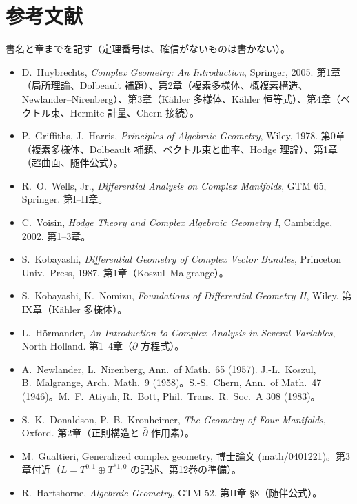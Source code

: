\section*{参考文献}
書名と章までを記す（定理番号は、確信がないものは書かない）。
\begin{itemize}
\item D.~Huybrechts, \emph{Complex Geometry: An Introduction}, Springer, 2005. 第1章（局所理論、Dolbeault 補題）、第2章（複素多様体、概複素構造、Newlander--Nirenberg）、第3章（Kähler 多様体、Kähler 恒等式）、第4章（ベクトル束、Hermite 計量、Chern 接続）。
\item P.~Griffiths, J.~Harris, \emph{Principles of Algebraic Geometry}, Wiley, 1978. 第0章（複素多様体、Dolbeault 補題、ベクトル束と曲率、Hodge 理論）、第1章（超曲面、随伴公式）。
\item R.~O.~Wells, Jr., \emph{Differential Analysis on Complex Manifolds}, GTM 65, Springer. 第I--II章。
\item C.~Voisin, \emph{Hodge Theory and Complex Algebraic Geometry I}, Cambridge, 2002. 第1--3章。
\item S.~Kobayashi, \emph{Differential Geometry of Complex Vector Bundles}, Princeton Univ.\ Press, 1987. 第1章（Koszul--Malgrange）。
\item S.~Kobayashi, K.~Nomizu, \emph{Foundations of Differential Geometry II}, Wiley. 第IX章（Kähler 多様体）。
\item L.~Hörmander, \emph{An Introduction to Complex Analysis in Several Variables}, North-Holland. 第1--4章（$\bar\partial$ 方程式）。
\item A.~Newlander, L.~Nirenberg, Ann.\ of Math.\ 65 (1957). \quad J.-L.~Koszul, B.~Malgrange, Arch.\ Math.\ 9 (1958)\tQ。\quad S.-S.~Chern, Ann.\ of Math.\ 47 (1946)。\quad M.~F.~Atiyah, R.~Bott, Phil.\ Trans.\ R.\ Soc.\ A 308 (1983)\tQ。
\item S.~K.~Donaldson, P.~B.~Kronheimer, \emph{The Geometry of Four-Manifolds}, Oxford. 第2章（正則構造と $\bar\partial$-作用素）。
\item M.~Gualtieri, Generalized complex geometry, 博士論文 (math/0401221)。第3章付近（$L=T^{0,1}\oplus T^{*1,0}$ の記述、第12巻の準備）\tQ。
\item R.~Hartshorne, \emph{Algebraic Geometry}, GTM 52. 第II章 §8（随伴公式）。
\end{itemize}

